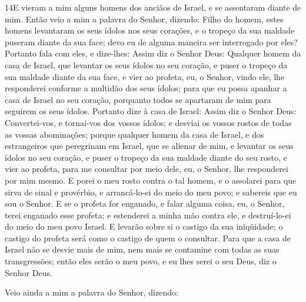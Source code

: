 \lettrine{14} E vieram a mim alguns homens dos anciãos de
Israel, e se assentaram diante de mim. Então veio a mim a
palavra do Senhor, dizendo: Filho do homem, estes homens
levantaram os seus ídolos nos seus corações, e o tropeço da sua
maldade puseram diante da sua face; devo eu de alguma maneira ser
interrogado por eles? Portanto fala com eles, e dize-lhes: Assim
diz o Senhor Deus: Qualquer homem da casa de Israel, que levantar os
seus ídolos no seu coração, e puser o tropeço da sua maldade diante
da sua face, e vier ao profeta, eu, o Senhor, vindo ele, lhe
responderei conforme a multidão dos seus ídolos; para que eu
possa apanhar a casa de Israel no seu coração, porquanto todos se
apartaram de mim para seguirem os seus ídolos. Portanto dize à
casa de Israel: Assim diz o Senhor Deus: Convertei-vos, e tornai-vos
dos vossos ídolos; e desviai os vossos rostos de todas as vossas
abominações; porque qualquer homem da casa de Israel, e dos
estrangeiros que peregrinam em Israel, que se alienar de mim, e
levantar os seus ídolos no seu coração, e puser o tropeço da sua
maldade diante do seu rosto, e vier ao profeta, para me consultar
por meio dele, eu, o Senhor, lhe responderei por mim mesmo. E
porei o meu rosto contra o tal homem, e o assolarei para que sirva
de sinal e provérbio, e arrancá-lo-ei do meio do meu povo; e
sabereis que eu sou o Senhor. E se o profeta for enganado, e
falar alguma coisa, eu, o Senhor, terei enganado esse profeta; e
estenderei a minha mão contra ele, e destruí-lo-ei do meio do meu
povo Israel. E levarão sobre si o castigo da sua iniqüidade;
o castigo do profeta será como o castigo de quem o consultar.
Para que a casa de Israel não se desvie mais de mim, nem mais
se contamine com todas as suas transgressões; então eles serão o meu
povo, e eu lhes serei o seu Deus, diz o Senhor Deus.

Veio ainda a mim a palavra do Senhor, dizendo:

